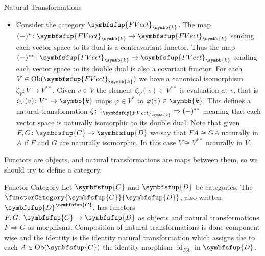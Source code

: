 \documentclass[fleqn]{NotesClass}
\makeatletter
\newcommand{\cat}[1]{\symbfsfup{#1}}
\newcommand{\c@egory}[1]{\symbfsfup{#1}}
\renewcommand{\field}{\symbb{k}}
\newcommand{\FVect}[1][\field]{{\c@egory{FVect}_{#1}}}
\DeclareMathOperator{\Ob}{Ob}
\DeclareMathOperator{\id}{id}
\newcommand{\isomorphic}{\cong}
\newcommand{\naturalTransformation}{\Rightarrow}
\makeatother
\begin{document}
\begin{exm}{Natural Transformations}{}
\begin{itemize}
            \item Consider the category \(\FVect\).
            The map \((-)^* \colon \FVect \to \FVect\) sending each vector space to its dual is a contravariant functor.
            Thus the map \((-)^{**} \colon \FVect \to \FVect\) sending each vector space to its double dual is also a covariant functor.
            For each \(V \in \Ob(\FVect)\) we have a canonical isomorphism \(\zeta_V \colon V \to V^{**}\).
            Given \(v \in V\) the element \(\zeta_V(v) \in V^{**}\) is evaluation at \(v\), that is \(\zeta_V(v) \colon V^* \to \field\) maps \(\varphi \in V^*\) to \(\varphi(v) \in \field\).
            This defines a natural transformation \(\zeta \colon 1_{\FVect} \naturalTransformation (-)^{**}\) meaning that each vector space is naturally isomorphic to its double dual.
            Note that given \(F, G \colon \cat{C} \to \cat{D}\) we say that \(FA \isomorphic GA\) naturally in \(A\) if \(F\) and \(G\) are naturally isomorphic.
            In this case \(V \isomorphic V^{**}\) naturally in \(V\).
        \end{itemize}
    \end{exm}
    
    Functors are objects, and natural transformations are maps between them, so we should try to define a category.
    \begin{dfn}{Functor Category}{}
        Let \(\cat{C}\) and \(\cat{D}\) be categories.
        The  \(\functorCategory{\cat{C}}{\cat{D}}\), also written \(\cat{D}^{\cat{C}}\), has functors \(F, G \colon \cat{C} \to \cat{D}\) as objects and natural transformations \(F \naturalTransformation G\) as morphisms.
        Composition of natural transformations is done component wise and the identity is the identity natural transformation which assigns the to each \(A \in \Ob(\cat{C})\) the identity morphism \(\id_{FA}\) in \(\cat{D}\).
    \end{dfn}
    
\end{document}

